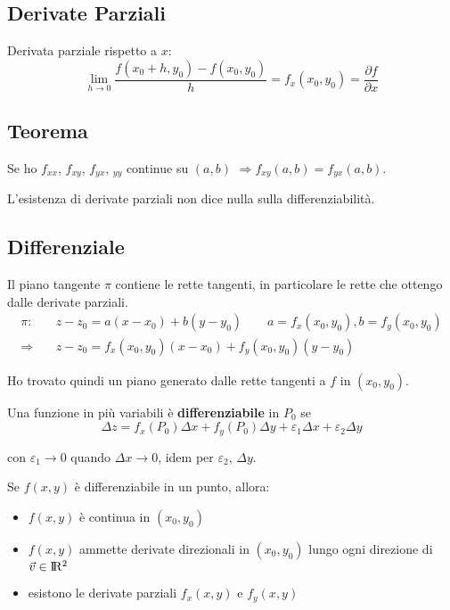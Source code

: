 \documentclass[10pt,a4paper,fleqn]{article}
\begin{document}
	\subsection{Derivate Parziali}

	Derivata parziale rispetto a $x$:
	\begin{equation}
	\lim_{h \to 0} \frac{f(x_0+h, y_0) - f(x_0, y_0)}{h}=f_x(x_0, y_0)=\frac{\partial f}{\partial x}
	\end{equation}

	\subsection{Teorema} 
	
	Se ho $f_{xx}$, $f_{xy}$, $f_{yx}$, $_{yy}$ continue su $(a, b)$ $\Rightarrow f_{xy}(a, b) = f_{yx}(a, b)$.
	
	L'esistenza di derivate parziali non dice nulla sulla differenziabilità.

	\subsection{Differenziale}

	Il piano tangente $\pi$ contiene le rette tangenti, in particolare le rette che ottengo dalle derivate parziali.
	\begin{equation}
	\begin{split}
	\pi:\quad &z-z_0 = a(x-x_0) + b(y-y_0) \qquad a=f_x(x_0, y_0), b=f_y(x_0, y_0)\\
	\Rightarrow\quad &z-z_0 = f_x(x_0, y_0)(x-x_0) + f_y(x_0, y_0)(y-y_0)
	\end{split}
	\end{equation}
	
	Ho trovato quindi un piano generato dalle rette tangenti a $f$ in $(x_0, y_0)$.
	
	Una funzione in più variabili è \textbf{differenziabile} in $P_0$ se
	\[\varDelta z = f_x(P_0)\varDelta x + f_y(P_0)\varDelta y + \varepsilon_1\Delta x + \varepsilon_2\varDelta y \]
	
	con $\varepsilon_1\rightarrow 0$ quando $\varDelta x \rightarrow 0$, idem per $\varepsilon_2$, $\varDelta y$.
	
	Se $f(x,y)$ è differenziabile in un punto, allora:
	\begin{itemize}
		\item $f(x,y)$ è continua in $(x_0, y_0)$
		\item $f(x,y)$ ammette derivate direzionali in $(x_0, y_0)$ lungo ogni direzione di $\vec v \in \rm I\!R^2$
		\item esistono le derivate parziali $f_x(x,y)$ e $f_y(x,y)$
	\end{itemize}
\end{document}
